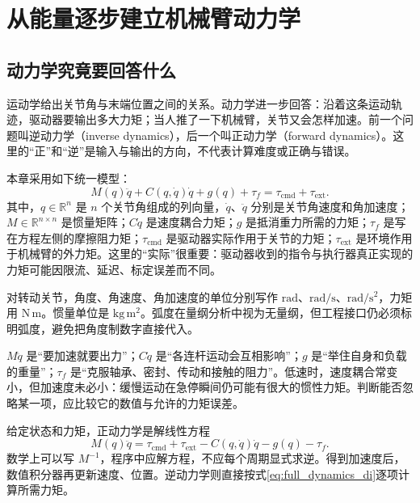 \chapter{从能量逐步建立机械臂动力学}\label{ch:dynamics}
\section{动力学究竟要回答什么}
运动学给出关节角与末端位置之间的关系。动力学进一步回答：沿着这条运动轨迹，驱动器要输出多大力矩；当人推了一下机械臂，关节又会怎样加速。前一个问题叫逆动力学（inverse dynamics），后一个叫正动力学（forward dynamics）。这里的“正”和“逆”是输入与输出的方向，不代表计算难度或正确与错误。

本章采用如下统一模型：
\begin{equation}\label{eq:full_dynamics_di}
 M(q)\ddot q+C(q,\dot q)\dot q+g(q)+\tau_f=\tau_{\mathrm{cmd}}+\tau_{\mathrm{ext}}.
\end{equation}
其中，$q\in\mathbb R^n$ 是 $n$ 个关节角组成的列向量，$\dot q$、$\ddot q$ 分别是关节角速度和角加速度；$M\in\mathbb R^{n\times n}$ 是惯量矩阵；$C\dot q$ 是速度耦合力矩；$g$ 是抵消重力所需的力矩；$\tau_f$ 是写在方程左侧的摩擦阻力矩；$\tau_{\mathrm{cmd}}$ 是驱动器实际作用于关节的力矩；$\tau_{\mathrm{ext}}$ 是环境作用于机械臂的外力矩。这里的“实际”很重要：驱动器收到的指令与执行器真正实现的力矩可能因限流、延迟、标定误差而不同。

对转动关节，角度、角速度、角加速度的单位分别写作 $\mathrm{rad}$、$\mathrm{rad/s}$、$\mathrm{rad/s^2}$，力矩用 $\mathrm{N\,m}$。惯量单位是 $\mathrm{kg\,m^2}$。弧度在量纲分析中视为无量纲，但工程接口仍必须标明弧度，避免把角度制数字直接代入。

\begin{conceptbox}[各项的直觉]
$M\ddot q$ 是“要加速就要出力”；$C\dot q$ 是“各连杆运动会互相影响”；$g$ 是“举住自身和负载的重量”；$\tau_f$ 是“克服轴承、密封、传动和接触的阻力”。低速时，速度耦合常变小，但加速度未必小：缓慢运动在急停瞬间仍可能有很大的惯性力矩。判断能否忽略某一项，应比较它的数值与允许的力矩误差。
\end{conceptbox}

给定状态和力矩，正动力学是解线性方程
\begin{equation}
 M(q)\ddot q=\tau_{\mathrm{cmd}}+\tau_{\mathrm{ext}}-C(q,\dot q)\dot q-g(q)-\tau_f.
\end{equation}
数学上可以写 $M^{-1}$，程序中应解方程，不应每个周期显式求逆。得到加速度后，数值积分器再更新速度、位置。逆动力学则直接按式\eqref{eq:full_dynamics_di}逐项计算所需力矩。

